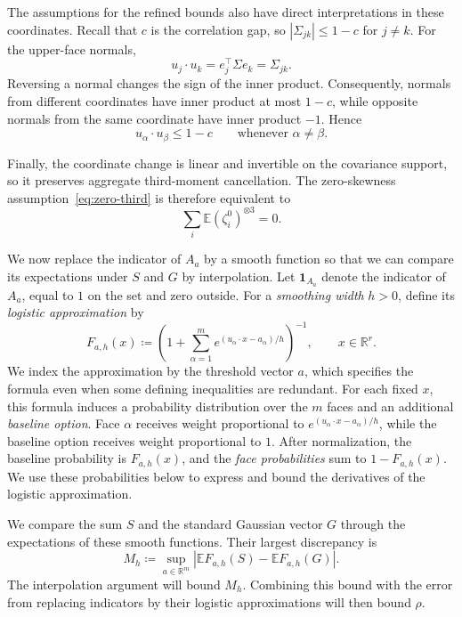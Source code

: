 \documentclass[11pt,letterpaper]{article}
\theoremstyle{remark}
\newcommand{\E}{\mathbb E}
\newcommand{\R}{\mathbb R}
\newcommand{\ind}{\mathbf 1}
\begin{document}
The assumptions for the refined bounds also have direct interpretations
in these coordinates. Recall that \(c\) is the correlation gap, so
\(|\Sigma_{jk}|\le1-c\) for \(j\ne k\). For the upper-face normals,
\[
 u_j\cdot u_k=e_j^\top\Sigma e_k=\Sigma_{jk}.
\]
Reversing a normal changes the sign of the inner product.
Consequently, normals from different coordinates have inner product
at most \(1-c\), while opposite normals from the same coordinate
have inner product \(-1\). Hence
\[
 u_\alpha\cdot u_\beta\le1-c\qquad\text{whenever }\alpha\ne\beta.
\]

Finally, the coordinate change is linear and invertible on the
covariance support, so it preserves aggregate third-moment
cancellation. The zero-skewness assumption~\eqref{eq:zero-third}
is therefore equivalent to
\begin{equation}
 \sum_i\E(\zeta_i^0)^{\otimes3}=0.
 \label{eq:zero-third-support}
\end{equation}


We now replace the indicator of \(A_a\) by a smooth function so that
we can compare its expectations under \(S\) and \(G\) by interpolation.
Let \(\ind_{A_a}\) denote
the indicator of \(A_a\), equal to \(1\) on the set and zero outside.
For a \emph{smoothing width} \(h>0\), define its
\emph{logistic approximation} by
\begin{equation}
 F_{a,h}(x)\coloneqq
 \left(1+\sum_{\alpha=1}^m
 e^{(u_\alpha\cdot x-a_\alpha)/h}\right)^{-1},
 \qquad x\in\R^r.
 \label{eq:selector}
\end{equation}
We index the approximation by the threshold vector \(a\), which
specifies the formula even when some defining inequalities are redundant.
For each fixed \(x\), this formula induces a probability distribution
over the \(m\) faces and an additional \emph{baseline option}. Face
\(\alpha\) receives weight proportional to \(e^{(u_\alpha\cdot x-a_\alpha)/h}\),
while the baseline option receives weight proportional to \(1\). After normalization,
the baseline probability is \(F_{a,h}(x)\), and the \emph{face probabilities}
sum to \(1-F_{a,h}(x)\). We use these probabilities below to express
and bound the derivatives of the logistic approximation.

We compare the sum \(S\) and the standard Gaussian vector \(G\)
through the expectations of these smooth functions. Their largest
discrepancy is
\begin{equation}
 M_h\coloneqq\sup_{a\in\R^m}
 \left|\E F_{a,h}(S)-\E F_{a,h}(G)\right|.
 \label{eq:smoothed-discrepancy}
\end{equation}
The interpolation argument will bound \(M_h\). Combining this
bound with the error from replacing indicators by their logistic
approximations will then bound \(\rho\).
\end{document}

